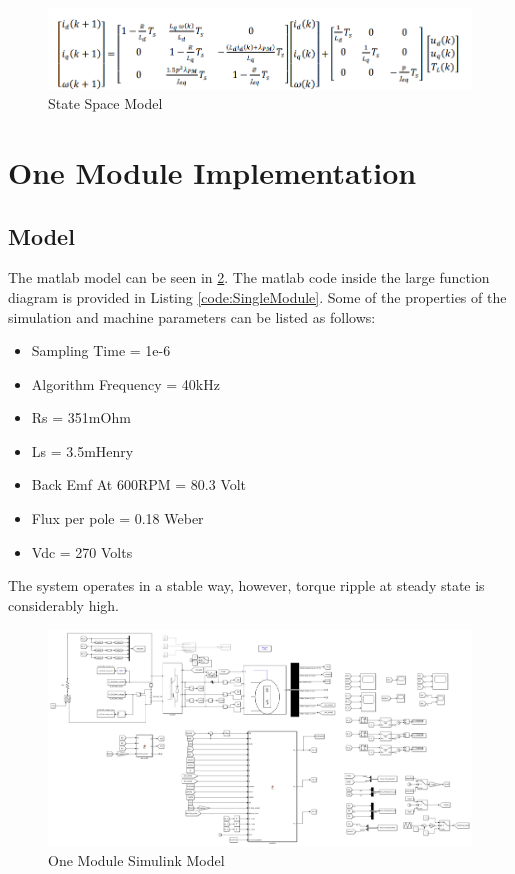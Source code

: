\documentclass{article}
\begin{document}
\begin{figure}[H]
\centering
\includegraphics[scale=0.5]{Figures/StateSpaceModel.PNG}
\caption{State Space Model \citep{ExperimentalImplementationOfModelPredictiveControlForPermanentMagnetSynchronousMotor}}
\label{fig:StateSpaceModel}
\end{figure}

\section{One Module Implementation}
\subsection{Model}
The matlab model can be seen in \ref{fig:OneModuleSimulinkModel}. The matlab code inside the large function diagram is provided in Listing \ref{code:SingleModule}. Some of the properties of the simulation and machine parameters can be listed as follows:
\begin{itemize}
    \item Sampling Time = 1e-6
    \item Algorithm Frequency = 40kHz
    \item Rs = 351mOhm
    \item Ls = 3.5mHenry
    \item Back Emf At 600RPM = 80.3 Volt
    \item Flux per pole = 0.18 Weber
    \item Vdc = 270 Volts
\end{itemize}





The system operates in a stable way, however, torque ripple at steady state is considerably high.

\begin{figure}[H]
\centering
\includegraphics[scale=0.3]{Figures/OneModuleSimulinkModel.PNG}
\caption{One Module Simulink Model}
\label{fig:OneModuleSimulinkModel}
\end{figure}
\end{document}

